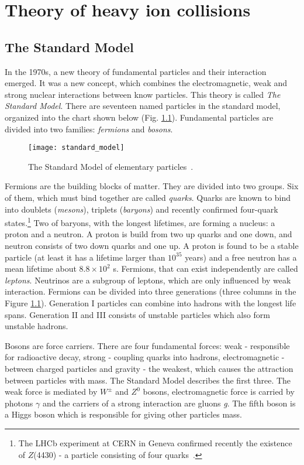 \chapter{Theory of heavy ion collisions}
  \section{The Standard Model}
    In the 1970s, a new theory of fundamental particles and their interaction emerged.
    It was a new concept, which combines the electromagnetic, weak and strong nuclear interactions between know particles.
    This theory is called \textit{The Standard Model}.
    There are seventeen named particles in the standard model, organized into the chart shown below (Fig. \ref{fig:standard_model}).
    Fundamental particles are divided into two families: \textit{fermions} and \textit{bosons}.
     \begin{figure}[h]
       \centering
       \texttt{[image: standard\_model]}
       \caption{The Standard Model of elementary particles~\cite{sm_svg}.}
       \label{fig:standard_model}
     \end{figure}
     
    Fermions are the building blocks of matter.
    They are divided into two groups.
    Six of them, which must bind together are called \textit{quarks}.
    Quarks are known to bind into doublets (\textit{mesons}), triplets (\textit{baryons}) and recently confirmed four-quark states.\footnote{The LHCb experiment at CERN in Geneva confirmed recently the existence of $Z$(4430) - a particle consisting of four quarks~\cite{fourquark}.}
    Two of baryons, with the longest lifetimes, are forming a nucleus: a proton and a neutron.
    A proton is build from two up quarks and one down, and neutron consists of two down quarks and one up.
    A proton is found to be a stable particle (at least it has a lifetime larger than $10^{35}$ years) and a free neutron has a mean lifetime about $8.8\times10^2$ s.
    Fermions, that can exist independently are called \textit{leptons}.
    Neutrinos are a subgroup of leptons, which are only influenced by weak interaction.
    Fermions can be divided into three generations (three columns in the Figure \ref{fig:standard_model}).
    Generation I particles can combine into hadrons with the longest life spans. 
    Generation II and III consists of unstable particles which also form unstable hadrons. 
    
    Bosons are force carriers.
    There are four fundamental forces: weak - responsible for radioactive decay, strong - coupling quarks into hadrons, electromagnetic - between charged particles and gravity - the weakest, which causes the attraction between particles with mass.
    The Standard Model describes the first three.
    The weak force is mediated by $W^{\pm}$ and $Z^0$ bosons, electromagnetic force is carried by photons $\gamma$ and the carriers of a strong interaction are gluons \textit{g}.
    The fifth boson is a Higgs boson which is responsible for giving other particles mass. 
 
